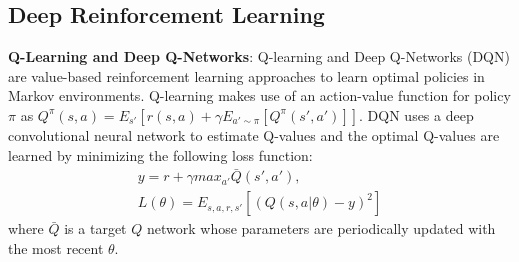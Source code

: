 \documentclass{article}
\begin{document}
\subsection{Deep Reinforcement Learning}
\begin{comment}
\textbf{Q-Learning and Deep Q-Networks}: Q-learning and Deep Q-Networks (DQN) \cite{mnih2013playing, mnih2015human} are popular value-based reinforcement learning approaches to learn optimal policies in Markov environments. Q-learning makes use of an action-value function for policy $\pi$ as $Q^{\pi}(s,a)=E_{s'}[r(s,a)+\gamma E_{a' \sim \pi}[Q^{\pi}(s',a')]]$. DQN uses a deep convolutional neural network to estimate Q-values and the optimal Q-values are learned by minimizing the following loss function:
\begin{eqnarray}
y = r + \gamma max_{a'}\bar{Q}(s',a'), \\
L(\theta) = E_{s,a,r,s'}[(Q(s,a|\theta)-y)^2]
\end{eqnarray}
where $\bar{Q}$ is a target $Q$ network whose parameters are periodically updated with the most recent $\theta$.

\textbf{Policy Gradient and Actor-Critic Algorithms}:  Policy Gradient methods are also popular for a variety of RL tasks. Their objective is to maximize $J(\theta)=E_{s \sim p^{\pi},a \sim \pi_{\theta}}[R]$ by taking steps in the direction of $\bigtriangledown _{\theta}J(\theta)$, where
\begin{eqnarray}
\bigtriangledown _{\theta}J(\theta) = E_{s \sim p^{\pi},a \sim \pi_{\theta}}[\bigtriangledown_{\theta}log\pi_{\theta}(a|s)Q^{\pi}(s,a)]
\end{eqnarray}
where $p^{\pi}$ is the state transition distribution. In practical algorithms, the value of $Q^{\pi}$ can be estimated in different ways. For example, one can simply use sample return $\sum_{i=t}^T \gamma^{i-t}r_i$ over a sample trajectory to obtain the REINFORCE algorithm \cite{williams1992simple}. Alternatively, one learns an approximation of the true action-value function using temporal-difference learning techniques. In this case, $Q^{\pi}(s,a)$ serves as a critic to guide the updating direction of $\pi_{\theta}$, which leads to a class of actor-critic algorithms \cite{schulman2015high,wang2016sample}.
\end{comment}

\textbf{Q-Learning and Deep Q-Networks}: Q-learning and Deep Q-Networks (DQN) \cite{mnih2013playing,mnih2015human} are value-based reinforcement learning approaches to learn optimal policies in Markov environments. Q-learning makes use of an action-value function for policy $\pi$ as $Q^{\pi}(s,a)=E_{s'}[r(s,a)+\gamma E_{a' \sim \pi}[Q^{\pi}(s',a')]]$. DQN uses a deep convolutional neural network to estimate Q-values and the optimal Q-values are learned by minimizing the following loss function:
\begin{eqnarray}
y = r + \gamma max_{a'}\bar{Q}(s',a'), \\
L(\theta) = E_{s,a,r,s'}[(Q(s,a|\theta)-y)^2]
\end{eqnarray}
where $\bar{Q}$ is a target $Q$ network whose parameters are periodically updated with the most recent $\theta$.
\end{document}
